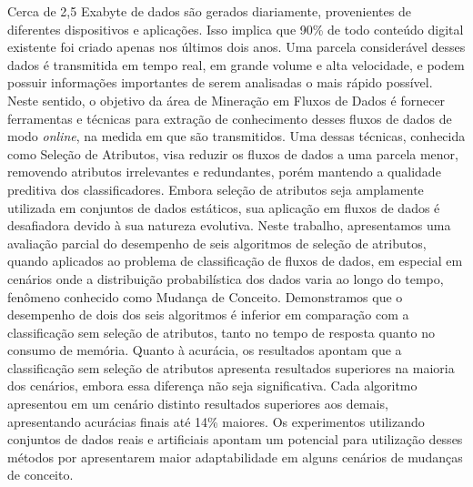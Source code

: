 \documentclass[Portugues,Final]{tese-FT}
\begin{document}
\begin{resumo}
Cerca de 2,5 Exabyte de dados são gerados diariamente, provenientes de diferentes dispositivos e aplicações. Isso implica que 90\% de todo conteúdo digital existente foi criado apenas nos últimos dois anos. Uma parcela considerável desses dados
é transmitida em tempo real, em grande volume e alta velocidade, e podem possuir informações importantes de serem analisadas o mais rápido possível. Neste sentido, o objetivo da área de Mineração em Fluxos de Dados é fornecer ferramentas e técnicas para extração de conhecimento desses fluxos de dados de modo \textit{online}, 
na medida em que são transmitidos. Uma dessas técnicas, conhecida como Seleção de Atributos, visa reduzir os fluxos de dados a uma parcela menor, removendo atributos irrelevantes e redundantes, porém mantendo a qualidade preditiva dos classificadores. Embora seleção de atributos seja amplamente utilizada em conjuntos de dados estáticos, sua aplicação em fluxos de dados é desafiadora devido à sua natureza evolutiva. Neste trabalho, apresentamos uma avaliação parcial do desempenho de seis algoritmos de seleção de atributos, quando aplicados ao problema de classificação de fluxos de dados, em especial em cenários onde a distribuição probabilística dos dados varia ao longo do tempo, fenômeno conhecido como Mudança de Conceito. Demonstramos que o desempenho de dois dos seis algoritmos é inferior em comparação com a classificação sem seleção de atributos, tanto no tempo de resposta quanto no consumo de memória. Quanto à acurácia, os resultados apontam que a classificação sem seleção de atributos apresenta resultados superiores na maioria dos cenários, embora essa diferença não seja significativa. Cada algoritmo apresentou em um cenário distinto resultados superiores aos demais, apresentando acurácias finais até 14\% maiores. Os experimentos utilizando conjuntos de dados reais e artificiais apontam um potencial para utilização desses métodos por apresentarem maior adaptabilidade em alguns cenários de mudanças de conceito.


\end{resumo}
\end{document}
